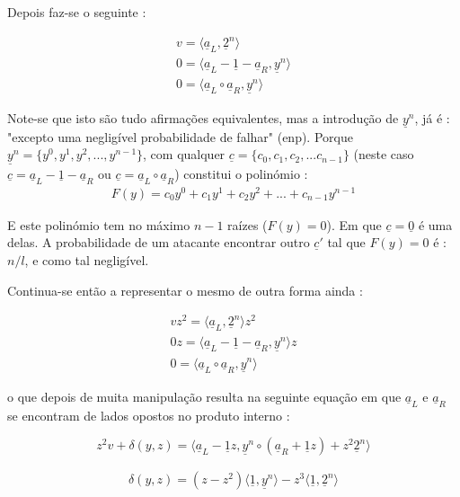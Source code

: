 Depois faz-se o seguinte :

\begin{align*}
v = \langle\underline{a}_L, \underline{2}^n\rangle\\
0 = \langle\underline{a}_L - \underline{1} - \underline{a}_R, \underline{y}^n\rangle\\
0 = \langle\underline{a}_L \circ \underline{a}_R, \underline{y}^n\rangle
\end{align*}

Note-se que isto são tudo afirmações equivalentes, mas a introdução de $\underline{y}^n$, já é : "excepto uma negligível probabilidade de falhar" (enp).
Porque $\underline{y}^n = \{y^0, y^1, y^2, ..., y^{n-1}\}$, com qualquer $\underline{c} = \{c_0, c_1, c_2, ...c_{n-1}\}$ (neste caso $\underline{c} = \underline{a}_L - \underline{1} - \underline{a}_R$ ou $\underline{c} = \underline{a}_L \circ \underline{a}_R$) constitui o polinómio : 
\begin{align*}
F(y) = c_0 y^0 + c_1 y^1 + c_2 y^2 + ... + c_{n-1} y^{n-1}   
\end{align*}

E este polinómio tem no máximo $n - 1$ raízes ($F(y) = 0$). Em que $\underline{c} = \underline{0}$ é uma delas. A probabilidade de um atacante encontrar outro $\underline{c}'$ tal que $F(y) = 0$ é : $n/l$, e como tal negligível.\newline

Continua-se então a representar o mesmo de outra forma ainda :

\begin{align*}
vz^2 = \langle\underline{a}_L, \underline{2}^n\rangle z^2\\
0z = \langle\underline{a}_L - \underline{1} - \underline{a}_R, \underline{y}^n\rangle z\\
0 = \langle\underline{a}_L \circ \underline{a}_R, \underline{y}^n\rangle
\end{align*}

o que depois de muita manipulação resulta na seguinte equação em que $\underline{a}_L$ e $\underline{a}_R$ se encontram de lados opostos no produto interno :  \newline

\begin{equation}
z^2 v + \delta(y,z) = \langle\underline{a}_L - \underline{1}z, \underline{y}^n \circ (\underline{a}_R + \underline{1}z) + z^2 \underline{2}^n\rangle 
\end{equation}

\begin{align*}
\delta(y,z) = (z - z^2)  \langle \underline{1}, \underline{y}^n \rangle - z^3 \langle \underline{1}, \underline{2}^n \rangle
\end{align*}

